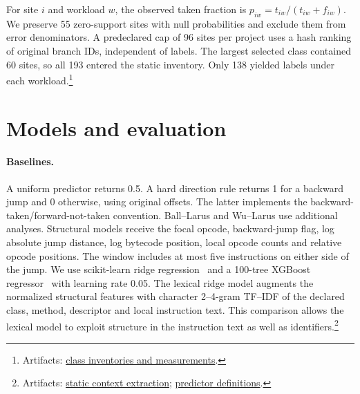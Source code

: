 \documentclass[11pt]{article}
\newcommand{\repocommit}{81d03caebe268d013b3163bcbff31cadabaaec21}
\newcommand{\repourl}{https://github.com/minggu151623/llm_profiling_research}
\newcommand{\repo}[2]{\href{\repourl/blob/\repocommit/#1}{#2}}
\newcommand{\artifacts}[1]{\footnote{Artifacts: #1.}}
\begin{document}
For site $i$ and workload $w$, the observed taken fraction is $p_{iw}=t_{iw}/(t_{iw}+f_{iw})$. We preserve 55 zero-support sites with null probabilities and exclude them from error denominators. A predeclared cap of 96 sites per project uses a hash ranking of original branch IDs, independent of labels. The largest selected class contained 60 sites, so all 193 entered the static inventory. Only 138 yielded labels under each workload.\artifacts{\repo{experiments/study/corpus}{class inventories and measurements}}

\section{Models and evaluation}

\paragraph{Baselines.} A uniform predictor returns 0.5. A hard direction rule returns 1 for a backward jump and 0 otherwise, using original offsets. The latter implements the backward-taken/forward-not-taken convention. Ball--Larus and Wu--Larus use additional analyses. Structural models receive the focal opcode, backward-jump flag, log absolute jump distance, log bytecode position, local opcode counts and relative opcode positions. The window includes at most five instructions on either side of the jump. We use scikit-learn ridge regression~\citep{sklearn} and a 100-tree XGBoost regressor~\citep{xgboost} with learning rate 0.05. The lexical ridge model augments the normalized structural features with character 2--4-gram TF--IDF of the declared class, method, descriptor and local instruction text. This comparison allows the lexical model to exploit structure in the instruction text as well as identifiers.\artifacts{\repo{java/src/main/java/org/branchpilot/Corpus.java}{static context extraction}; \repo{ml/evaluate.py}{predictor definitions}}
\end{document}
